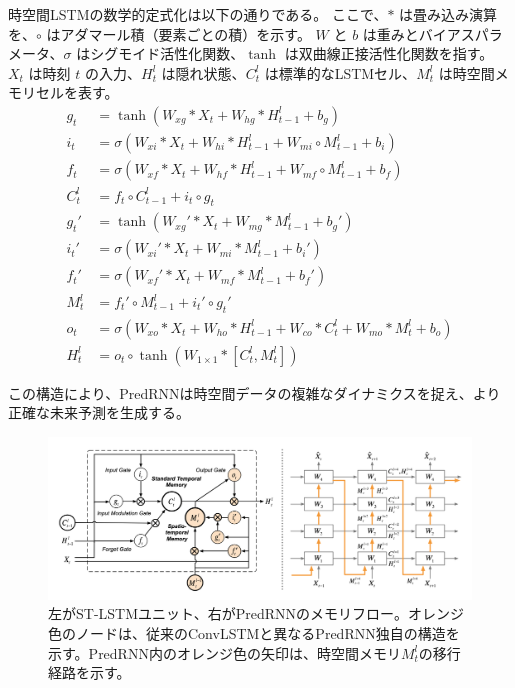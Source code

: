           時空間LSTMの数学的定式化は以下の通りである。
          ここで、\( \ast \) は畳み込み演算を、\( \circ \) はアダマール積（要素ごとの積）を示す。
          \( W \) と \( b \) は重みとバイアスパラメータ、\( \sigma \) はシグモイド活性化関数、\( \tanh \) は双曲線正接活性化関数を指す。
          \( X_t \) は時刻 \( t \) の入力、\( H_t^l \) は隠れ状態、\( C_t^l \) は標準的なLSTMセル、\( M_t^l \) は時空間メモリセルを表す。
          \begin{align}
          g_t &= \tanh(W_{xg} \ast X_t + W_{hg} \ast H_{t-1}^l + b_g) \\
          i_t &= \sigma(W_{xi} \ast X_t + W_{hi} \ast H_{t-1}^l + W_{mi} \circ M_{t-1}^l + b_i) \\
          f_t &= \sigma(W_{xf} \ast X_t + W_{hf} \ast H_{t-1}^l + W_{mf} \circ M_{t-1}^l + b_f) \\
          C_t^l &= f_t \circ C_{t-1}^l + i_t \circ g_t \\
          g_t' &= \tanh(W_{xg}' \ast X_t + W_{mg} \ast M_{t-1}^l + b_g') \\
          i_t' &= \sigma(W_{xi}' \ast X_t + W_{mi} \ast M_{t-1}^l + b_i') \\
          f_t' &= \sigma(W_{xf}' \ast X_t + W_{mf} \ast M_{t-1}^l + b_f') \\
          M_t^l &= f_t' \circ M_{t-1}^l + i_t' \circ g_t' \\
          o_t &= \sigma(W_{xo} \ast X_t + W_{ho} \ast H_{t-1}^l + W_{co} \ast C_t^l + W_{mo} \ast M_t^l + b_o) \\
          H_t^l &= o_t \circ \tanh(W_{1 \times 1} \ast [C_t^l, M_t^l])
          \end{align}
          
          この構造により、PredRNNは時空間データの複雑なダイナミクスを捉え、より正確な未来予測を生成する。
          \begin{figure}[htbp]
            \begin{center}
              \includegraphics[width=160mm]{figures/videoprediction/predrnn_unit.png}
              \caption{左がST-LSTMユニット、右がPredRNNのメモリフロー。オレンジ色のノードは、従来のConvLSTMと異なるPredRNN独自の構造を示す。PredRNN内のオレンジ色の矢印は、時空間メモリ\( M_t^l \)の移行経路を示す。}
              \label{fig:stlstm}
            \end{center}
          \end{figure}
        
